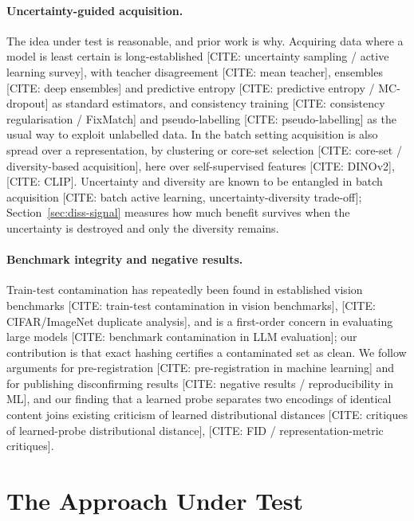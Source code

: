 \documentclass{article} %
\begin{document}
\paragraph{Uncertainty-guided acquisition.} The idea under test is reasonable, and prior work is why.
Acquiring data where a model is least certain is long-established
[CITE: uncertainty sampling / active learning survey], with teacher disagreement [CITE: mean teacher],
ensembles [CITE: deep ensembles] and predictive entropy [CITE: predictive entropy / MC-dropout] as
standard estimators, and consistency training [CITE: consistency regularisation / FixMatch] and
pseudo-labelling [CITE: pseudo-labelling] as the usual way to exploit unlabelled data. In the batch
setting acquisition is also spread over a representation, by clustering or core-set selection
[CITE: core-set / diversity-based acquisition], here over self-supervised features [CITE: DINOv2],
[CITE: CLIP]. Uncertainty and diversity are known to be entangled in batch acquisition
[CITE: batch active learning, uncertainty-diversity trade-off]; Section~\ref{sec:diss-signal} measures
how much benefit survives when the uncertainty is destroyed and only the diversity remains.

\paragraph{Benchmark integrity and negative results.} Train-test contamination has repeatedly been
found in established vision benchmarks [CITE: train-test contamination in vision benchmarks],
[CITE: CIFAR/ImageNet duplicate analysis], and is a first-order concern in evaluating large models
[CITE: benchmark contamination in LLM evaluation]; our contribution is that exact hashing certifies a
contaminated set as clean. We follow arguments for pre-registration
[CITE: pre-registration in machine learning] and for publishing disconfirming results
[CITE: negative results / reproducibility in ML], and our finding that a learned probe separates two
encodings of identical content joins existing criticism of learned distributional distances
[CITE: critiques of learned-probe distributional distance], [CITE: FID / representation-metric critiques].



\section{The Approach Under Test}
\label{sec:method}
\end{document}

